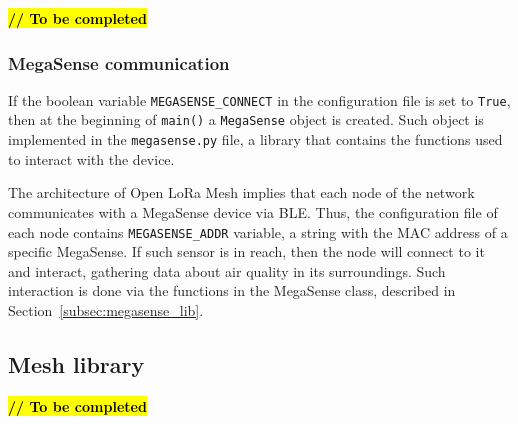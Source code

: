 				\textbf{\textcolor{red}{\hl{// To be completed}}}
			
			\subsubsection{MegaSense communication}
			
				If the boolean variable \texttt{MEGASENSE\_CONNECT} in the configuration file is set to \texttt{True}, then at the beginning of \texttt{main()} a \texttt{MegaSense} object is created.
				Such object is implemented in the \texttt{megasense.py} file, a library that contains the functions used to interact with the device.
				
				The architecture of Open LoRa Mesh implies that each node of the network communicates with a MegaSense device via BLE.
				Thus, the configuration file of each node contains \texttt{MEGASENSE\_ADDR} variable, a string with the MAC address of a specific MegaSense.
				If such sensor is in reach, then the node will connect to it and interact, gathering data about air quality in its surroundings.
				Such interaction is done via the functions in the MegaSense class, described in Section~\ref{subsec:megasense_lib}.
				
		\subsection{Mesh library}\label{subsec:mesh_library}
		
				\textbf{\textcolor{red}{\hl{// To be completed}}}
		
		
